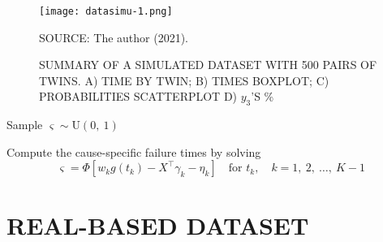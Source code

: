 \begin{figure}[H]
  \setlength{\abovecaptionskip}{.0001pt}
  \caption{SUMMARY OF A SIMULATED DATASET WITH 500 PAIRS OF TWINS. A)
    TIME BY TWIN; B) TIMES BOXPLOT; C) PROBABILITIES SCATTERPLOT D)
    \(y_{3}\)'S \%}
  \vspace{0.2cm} \centering
  \texttt{[image: datasimu-1.png]}
  \\
  \vspace{0.2cm}
  \begin{footnotesize}
    SOURCE: The author (2021).
  \end{footnotesize}
  \label{fig:datasimu}
\end{figure}

Sample \(\varsigma\sim\text{U}(0,~1)\)

Compute the cause-specific failure times by solving
\[
 \varsigma = \Phi[w_{k} g(t_{k}) - X^{\top}\gamma_{k} - \eta_{k}]
 \quad\text{for } t_{k}, \quad k = 1,~2,~\dots,~K - 1
\]

\section{REAL-BASED DATASET}
\label{cap:data}

